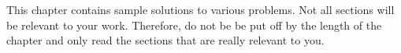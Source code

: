 This chapter contains sample solutions to various problems. Not all sections
will be relevant to your work. Therefore, do not be be put off by the length of
the chapter and only read the sections that are really relevant to you.

